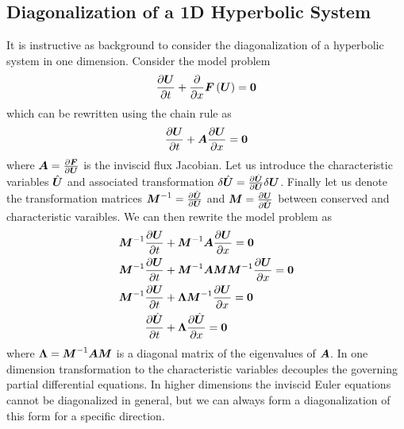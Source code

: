 \subsection{Diagonalization of a 1D Hyperbolic System}
It is instructive as background to consider the diagonalization of a hyperbolic system in one dimension.  Consider the model problem
\begin{equation}
  \pdv{\bv{U}}{t} + \pdv{}{x} \bv{F}\left(\bv{U}\right) = \bv{0}
\end{equation}
which can be rewritten using the chain rule as
\begin{equation}
  \pdv{\bv{U}}{t} + \bt{A} \pdv{\bv{U}}{x} = \bv{0}
\end{equation}
where $\bt{A}=\pdv{\bv{F}}{\bv{U}}$ is the inviscid flux Jacobian.  Let us introduce the characteristic variables $\hat{\bv{U}}$ and associated transformation $\delta\hat{\bv{U}} = \pdv{\hat{\bv{U}}}{\bv{U}} \delta\bv{U}$.  Finally let us denote the transformation matrices $\bt{M}^{-1}=\pdv{\hat{\bv{U}}}{\bv{U}}$ and  $\bt{M}=\pdv{\bv{U}}{\hat{\bv{U}}}$  between conserved and characteristic varaibles.  We can then rewrite the model problem as
\begin{align*}
  \bt{M}^{-1} \pdv{\bv{U}}{t} &+ \bt{M}^{-1} \bt{A} \pdv{\bv{U}}{x} = \bv{0} \\
  \bt{M}^{-1} \pdv{\bv{U}}{t} &+ \bt{M}^{-1} \bt{A} \bt{M} \bt{M}^{-1} \pdv{\bv{U}}{x} = \bv{0} \\
  \bt{M}^{-1} \pdv{\bv{U}}{t} &+ \bt{\Lambda} \bt{M}^{-1} \pdv{\bv{U}}{x} = \bv{0} \\
  \pdv{\hat{\bv{U}}}{t} &+ \bt{\Lambda} \pdv{\hat{\bv{U}}}{x} = \bv{0}
\end{align*}
where $\bt{\Lambda}=\bt{M}^{-1} \bt{A} \bt{M}$ is a diagonal matrix of the eigenvalues of $\bt{A}$. In one dimension transformation to the characteristic variables decouples the governing partial differential equations.  In higher dimensions the inviscid Euler equations cannot be diagonalized in general, but we can always form a diagonalization of this form for a specific direction. 


